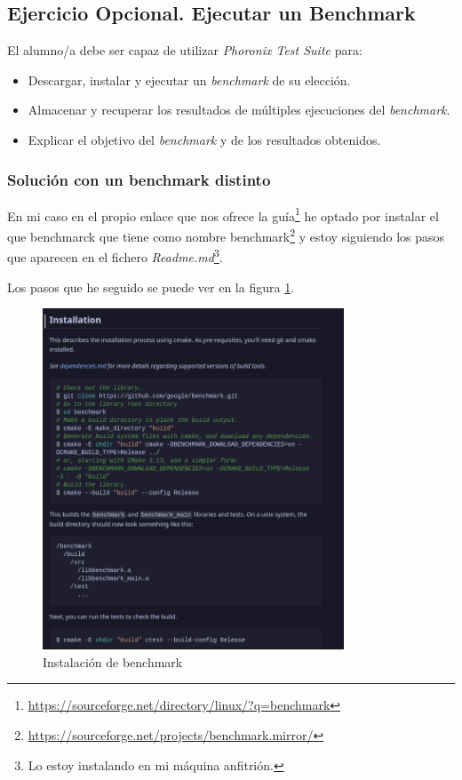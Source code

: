 \subsection{Ejercicio Opcional. Ejecutar un Benchmark}

El alumno/a debe ser capaz de utilizar \textit{Phoronix Test Suite} para:

\begin{itemize}
    \item Descargar, instalar y ejecutar un \textit{benchmark} de su elección.
    \item Almacenar y recuperar los resultados de múltiples ejecuciones del \textit{benchmark}.
    \item Explicar el objetivo del \textit{benchmark} y de los resultados obtenidos.
\end{itemize}

\subsubsection*{Solución con un benchmark distinto}

En mi caso en el propio enlace que nos ofrece la guía\footnote{\url{https://sourceforge.net/directory/linux/?q=benchmark}} he optado por instalar el que benchmarck que tiene como nombre benchmark\footnote{\url{https://sourceforge.net/projects/benchmark.mirror/}} y estoy siguiendo los pasos que aparecen en el fichero \textit{Readme.md}\footnote{Lo estoy instalando en mi máquina anfitrión.}.

Los pasos que he seguido se puede ver en la figura \ref{fig:benchmark}.

\begin{figure}[H]
    \centering
    \includegraphics[width=0.8\textwidth]{images/Bloque2/installationBench.png}
    \caption{Instalación de benchmark}
    \label{fig:benchmark}
\end{figure}

